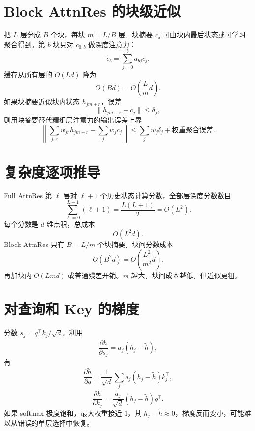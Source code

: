 \documentclass[UTF8,12pt,a4paper,fontset=none]{ctexart}
\numberwithin{equation}{section}
\begin{document}
\section{Block AttnRes 的块级近似}
把 $L$ 层分成 $B$ 个块，每块 $m=L/B$ 层。块摘要 $c_b$ 可由块内最后状态或可学习聚合得到。第 $b$ 块只对 $c_{0:b}$ 做深度注意力：
\begin{equation}
 \widetilde c_b=\sum_{j=0}^{b}a_{bj}c_j.
\end{equation}
缓存从所有层的 $O(Ld)$ 降为
\begin{equation}
 O(Bd)=O\left(\frac Lm d\right).
\end{equation}
如果块摘要近似块内状态 $h_{jm+r}$，误差
\begin{equation}
 \|h_{jm+r}-c_j\|\le\delta_j,
\end{equation}
则用块摘要替代精细层注意力的输出误差上界
\begin{equation}
 \left\|\sum_{j,r}w_{jr}h_{jm+r}-
 \sum_j\bar w_jc_j\right\|
 \le\sum_j\bar w_j\delta_j+
 \text{权重聚合误差}.
\end{equation}

\section{复杂度逐项推导}
Full AttnRes 第 $\ell$ 层对 $\ell+1$ 个历史状态计算分数，全部层深度分数数目
\begin{equation}
 \sum_{\ell=0}^{L-1}(\ell+1)=\frac{L(L+1)}2=O(L^2).
\end{equation}
每个分数是 $d$ 维点积，总成本
\begin{equation}
 O(L^2d).
\end{equation}
Block AttnRes 只有 $B=L/m$ 个块摘要，块间分数成本
\begin{equation}
 O(B^2d)=O\left(\frac{L^2}{m^2}d\right).
\end{equation}
再加块内 $O(Lmd)$ 或普通残差开销。$m$ 越大，块间成本越低，但近似更粗。

\section{对查询和 Key 的梯度}
分数 $s_j=q^\top k_j/\sqrt d$。利用
\begin{equation}
 \frac{\partial\widetilde h}{\partial s_j}=a_j(h_j-\widetilde h),
\end{equation}
有
\begin{equation}
 \frac{\partial\widetilde h}{\partial q}
 =\frac1{\sqrt d}
 \sum_ja_j(h_j-\widetilde h)k_j^\top,
\end{equation}
\begin{equation}
 \frac{\partial\widetilde h}{\partial k_j}
 =\frac{a_j}{\sqrt d}(h_j-\widetilde h)q^\top.
\end{equation}
如果 softmax 极度饱和，最大权重接近 1，其 $h_j-\widetilde h\approx0$，梯度反而变小，可能难以从错误的单层选择中恢复。
\end{document}
